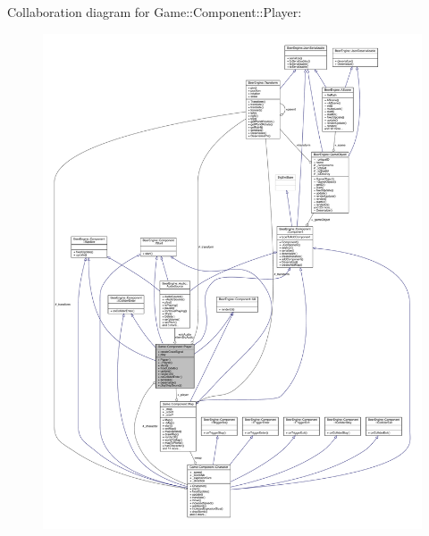 Collaboration diagram for Game\+:\+:Component\+:\+:Player\+:
\nopagebreak
\begin{figure}[H]
\begin{center}
\leavevmode
\includegraphics[width=350pt]{class_game_1_1_component_1_1_player__coll__graph}
\end{center}
\end{figure}
